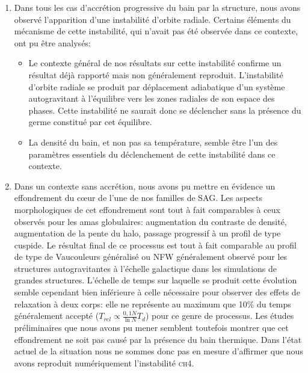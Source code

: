 \begin{enumerate}

	\item Dans tous les cas d'accrétion progressive du bain par la structure,
	nous avons observé l'apparition d'une instabilité d'orbite radiale.
	Certains éléments du mécanisme de cette instabilité,
	qui n'avait pas été observée dans ce contexte, ont pu être
	analysés:

	\begin{itemize}
		\item Le contexte général de nos résultats sur cette
		instabilité confirme un résultat déjà rapporté mais non
		généralement reproduit. L'instabilité d'orbite radiale se produit
		par déplacement adiabatique d'un système autogravitant à
		l'équilibre vers les zones radiales de son espace des phases. Cette
		instabilité ne saurait donc se déclencher sans la présence du
		germe constitué par cet équilibre.

		\item La densité du bain, et non pas sa température, semble être
		l'un des paramètres essentiels du déclenchement de cette
		instabilité dans ce contexte. 
	\end{itemize}

	\item Dans un contexte sans accrétion, nous avons pu mettre en
	évidence un effondrement du cœur de l'une de nos familles de SAG. Les
	aspects morphologiques de cet effondrement sont tout à fait comparables
	à ceux observés pour les amas globulaires: augmentation du contraste
	de densité, augmentation de la pente du halo, passage progressif à un
	profil de type cuspide. Le résultat final de ce processus est tout à
	fait comparable au profil de type de Vaucouleurs généralisé ou NFW
	généralement observé pour les structures autogravitantes à
	l'échelle galactique dans les simulations de grandes structures.
	L'échelle de temps sur laquelle se produit cette évolution semble
	cependant bien inférieure à celle nécessaire pour observer des
	effets de relaxation à deux corps: elle ne représente au maximum que
	10\% du temps généralement accepté ($T_{rel}\propto\frac{0,1N}{\ln
	N}T_{d}$) pour ce genre de processus. Les études préliminaires que
	nous avons pu mener semblent toutefois montrer que cet effondrement ne soit
	pas causé par la présence du bain thermique. Dans l'état actuel de
	la situation nous ne sommes donc pas en mesure d'affirmer que nous avons
	reproduit numériquement l'instabilité \textsc{ch4}.
\end{enumerate}



